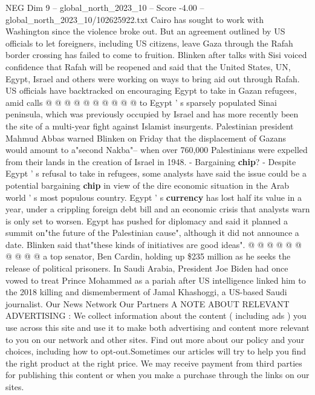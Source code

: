 \begin{textsample}{NEG Dim 9 – global\_north\_2023\_10 – Score -4.00 – global\_north\_2023\_10/102625922.txt}
Cairo has sought to work with Washington since the violence broke out.
But an agreement outlined by US officials to let foreigners, including US citizens, leave Gaza through the Rafah border crossing has failed to come to fruition.
Blinken after talks with Sisi voiced confidence that Rafah will be reopened and said that the United States, UN, Egypt, Israel and others were working on ways to bring aid out through Rafah.
US officials have backtracked on encouraging Egypt to take in Gazan refugees, amid calls @ @ @ @ @ @ @ @ @ @ to Egypt ' s sparsely populated Sinai peninsula, which was previously occupied by Israel and has more recently been the site of a multi-year fight against Islamist insurgents.
Palestinian president Mahmud Abbas warned Blinken on Friday that the displacement of Gazans would amount to a"second Nakba"-- when over 760,000 Palestinians were expelled from their lands in the creation of Israel in 1948. - Bargaining \textbf{chip}? - Despite Egypt ' s refusal to take in refugees, some analysts have said the issue could be a potential bargaining \textbf{chip} in view of the dire economic situation in the Arab world ' s most populous country.
Egypt ' s \textbf{currency} has lost half its value in a year, under a crippling foreign debt bill and an economic crisis that analysts warn is only set to worsen.
Egypt has pushed for diplomacy and said it planned a summit on"the future of the Palestinian cause", although it did not announce a date.
Blinken said that"these kinds of initiatives are good ideas". @ @ @ @ @ @ @ @ @ @ a top senator, Ben Cardin, holding up \$235 million as he seeks the release of political prisoners.
In Saudi Arabia, President Joe Biden had once vowed to treat Prince Mohammed as a pariah after US intelligence linked him to the 2018 killing and dismemberment of Jamal Khashoggi, a US-based Saudi journalist.
Our News Network Our Partners A NOTE ABOUT RELEVANT ADVERTISING : We collect information about the content ( including ads ) you use across this site and use it to make both advertising and content more relevant to you on our network and other sites.
Find out more about our policy and your choices, including how to opt-out.Sometimes our articles will try to help you find the right product at the right price.
We may receive payment from third parties for publishing this content or when you make a purchase through the links on our sites.

\end{textsample}
